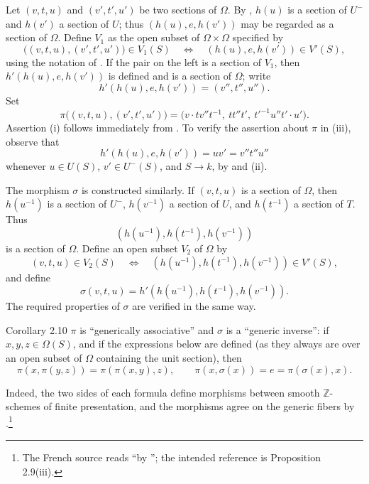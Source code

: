 \SGAProof
Let \((v,t,u)\) and \((v',t',u')\) be two sections of \(\Omega\).
By , \(h(u)\) is a section of \(U^-\) and \(h(v')\) a section
of \(U\); thus \((h(u),e,h(v'))\) may be regarded as a section of
\(\Omega\). Define \(V_1\) as the open subset of \(\Omega\times\Omega\)
specified by
\[
\bigl((v,t,u),(v',t',u')\bigr)\in V_1(S)
\quad\Longleftrightarrow\quad
(h(u),e,h(v'))\in V'(S),
\]
using the notation of . If the pair on the left is a section of
\(V_1\), then \(h'(h(u),e,h(v'))\) is defined and is a section of
\(\Omega\); write
\[
 h'(h(u),e,h(v'))=(v'',t'',u'').
\]
Set
\[
 \pi\bigl((v,t,u),(v',t',u')\bigr)
 =
 \bigl(v\cdot t v''t^{-1},\ tt''t',\
 t'^{-1}u''t'\cdot u'\bigr).
\]
Assertion (i) follows immediately from . To verify the assertion
about \(\pi\) in (iii), observe that
\[
 h'(h(u),e,h(v'))=uv'=v''t''u''
\]
whenever \(u\in U(S)\), \(v'\in U^-(S)\), and \(S\to k\), by
 and (ii).

The morphism \(\sigma\) is constructed similarly. If \((v,t,u)\) is a
section of \(\Omega\), then \(h(u^{-1})\) is a section of \(U^-\),
\(h(v^{-1})\) a section of \(U\), and \(h(t^{-1})\) a section of \(T\).
Thus
\[
 (h(u^{-1}),h(t^{-1}),h(v^{-1}))
\]
is a section of \(\Omega\).
Define an open subset \(V_2\) of \(\Omega\) by
\[
 (v,t,u)\in V_2(S)
 \quad\Longleftrightarrow\quad
 (h(u^{-1}),h(t^{-1}),h(v^{-1}))\in V'(S),
\]
and define
\[
 \sigma(v,t,u)=h'(h(u^{-1}),h(t^{-1}),h(v^{-1})).
\]
The required properties of \(\sigma\) are verified in the same way.


\begin{sgastatement}{Corollary 2.10}
\(\pi\) is ``generically associative'' and \(\sigma\) is a ``generic
inverse'': if \(x,y,z\in\Omega(S)\), and if the expressions below are
defined (as they always are over an open subset of \(\Omega\) containing
the unit section), then
\[
 \pi(x,\pi(y,z))=\pi(\pi(x,y),z),\qquad
 \pi(x,\sigma(x))=e=\pi(\sigma(x),x).
\]
\end{sgastatement}

Indeed, the two sides of each formula define morphisms between smooth
\(\mathbb Z\)-schemes of finite presentation, and the morphisms agree on
the generic fibers by .\footnote{The French source reads
``by \SGARefLink{sga3:xxv:proposition:2-9:item:iii}{2.10(iii)}''; the intended reference is Proposition 2.9(iii).}

